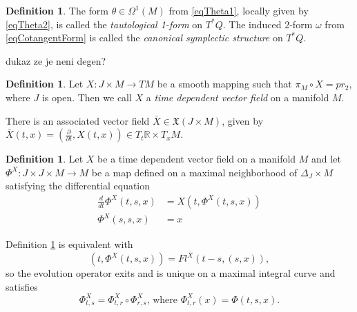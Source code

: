 \documentclass{article}
\theoremstyle{definition}
\newtheorem{definition}[theorem]{Definition}
\begin{document}
\begin{definition}
    The form $\theta \in \Omega^1(M)$ from \eqref{eqTheta1}, locally given by \eqref{eqTheta2}, is called the \textit{tautological 1-form} on $T^*Q$. The induced 2-form $\omega$ from \eqref{eqCotangentForm} is called the \textit{canonical symplectic structure} on $T^*Q$.
\end{definition}

dukaz ze je neni degen?

\begin{definition}
    Let $X: J \times M \rightarrow TM$ be a smooth mapping such that $\pi_M \circ X = pr_2$, where $J$ is open. Then we call $X$ a \textit{time dependent vector field} on a manifold $M$. 
\end{definition}
There is an associated vector field $\bar{X} \in \mathfrak{X}(J \times M)$, given by $\bar{X}(t, x)=(\frac{\partial}{\partial t}, X(t,x)) \in T_t\mathbb{R}\times T_xM$.

\begin{definition} \label{defEvolutionOperator}
    Let $X$ be a time dependent vector field on a manifold $M$ and let $\Phi^X: J \times J \times M \rightarrow M$ be a map defined on a maximal neighborhood of $\Delta_J\times M$ satisfying the differential equation
    \begin{equation}
        \begin{split}
            \frac{d}{d t} \Phi^X(t, s, x)&=X\left(t, \Phi^X(t, s, x)\right) \\ 
            \Phi^X(s,s,x) &= x
        \end{split}
    \end{equation}
\end{definition}
Definition \ref{defEvolutionOperator} is equivalent with 
\begin{equation*}
    (t,\Phi^X(t,s,x)) = Fl^{\bar{X}}(t-s, (s,x)),
\end{equation*}
so the evolution operator exits and is unique on a maximal integral curve and satisfies
\begin{equation*}
    \Phi_{t, s}^X=\Phi_{t, r}^X \circ \Phi_{r, s}^X \text{, where }\Phi_{t, r}^X(x) = \Phi(t,s,x).
\end{equation*}
\end{document}
